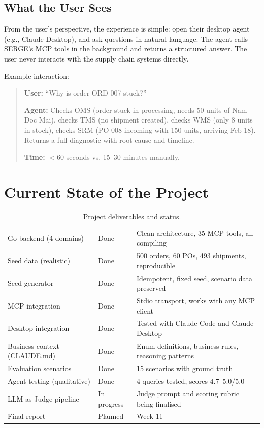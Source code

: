 \documentclass[11pt,a4paper]{article}
\begin{document}
\subsection{What the User Sees}

From the user's perspective, the experience is simple: open their desktop agent (e.g., Claude Desktop), and ask questions in natural language. The agent calls SERGE's MCP tools in the background and returns a structured answer. The user never interacts with the supply chain systems directly.

Example interaction:

\begin{quote}
\textbf{User:} ``Why is order ORD-007 stuck?''

\textbf{Agent:} Checks OMS (order stuck in processing, needs 50 units of Nam Doc Mai), checks TMS (no shipment created), checks WMS (only 8 units in stock), checks SRM (PO-008 incoming with 150 units, arriving Feb 18). Returns a full diagnostic with root cause and timeline.

\textbf{Time:} $<$60 seconds vs. 15--30 minutes manually.
\end{quote}

\section{Current State of the Project}

\begin{table}[H]
\centering\small
\caption{Project deliverables and status.}
\begin{tabularx}{\textwidth}{@{} L{4.5cm} l X @{}}
\toprule
{} &  &  \\
\midrule
Go backend (4 domains)      & Done & Clean architecture, 35 MCP tools, all compiling \\
Seed data (realistic)       & Done & 500 orders, 60 POs, 493 shipments, reproducible \\
Seed generator              & Done & Idempotent, fixed seed, scenario data preserved \\
MCP integration             & Done & Stdio transport, works with any MCP client \\
Desktop integration         & Done & Tested with Claude Code and Claude Desktop \\
Business context (CLAUDE.md) & Done & Enum definitions, business rules, reasoning patterns \\
Evaluation scenarios        & Done & 15 scenarios with ground truth \\
Agent testing (qualitative) & Done & 4 queries tested, scores 4.7--5.0/5.0 \\
LLM-as-Judge pipeline       & In progress & Judge prompt and scoring rubric being finalised \\
Final report                & Planned & Week 11 \\
\bottomrule
\end{tabularx}
\end{table}
\end{document}

